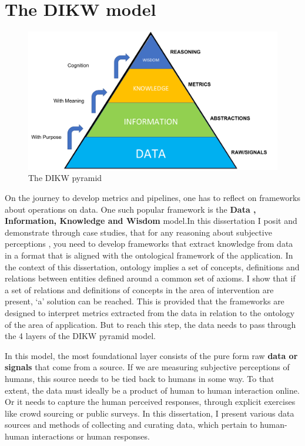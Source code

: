 \section{The DIKW model}

\begin{figure}[t!]
    \centering
    \includegraphics[width=\columnwidth]{DIKW.pdf}
    \caption{The DIKW pyramid}
    \label{fig:dikw}
\end{figure}

On the journey to develop metrics and pipelines, one has to reflect on frameworks about operations on data. One such popular framework is the \textbf{Data , Information, Knowledge and Wisdom} model\cite{rowley2007wisdom}.In this dissertation I posit and demonstrate through case studies, that for any reasoning about subjective perceptions , you need to develop frameworks that extract knowledge from data in a format that is aligned with the ontological framework of the application. In the context of this dissertation, ontology implies a set of concepts, definitions and relations between entities defined around a common set of axioms. I show that if a set of relations and definitions of concepts in the area of intervention are present, `a' solution can be reached. This is provided that the frameworks are designed to interpret metrics extracted from the data in relation to the ontology of the area of application. But to reach this step, the data needs to pass through the 4 layers of the DIKW pyramid model.

In this model, the most foundational layer consists of the pure form raw \textbf{data or signals} that come from a source. If we are measuring subjective perceptions of humans, this source needs to be tied back to humans in some way. To that extent, the data must ideally be a product of human to human interaction online. Or it needs to capture the human perceived responses, through explicit exercises like crowd sourcing or public surveys. In this dissertation, I present various data sources and methods of collecting and curating data, which pertain to human-human interactions or human responses. 

